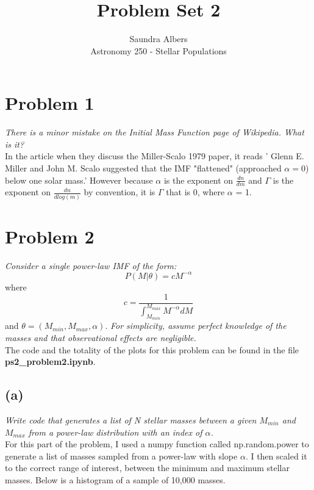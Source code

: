 \documentclass[english,11pt]{article}
\begin{document}
 

 
\title{Problem Set 2}
\author{Saundra Albers\\ 
Astronomy 250 - Stellar Populations} 
 
\maketitle
 

\section*{Problem 1}
\textit{There is a minor mistake on the Initial Mass Function page of Wikipedia. What is it?}\\
In the article when they discuss the Miller-Scalo 1979 paper, it reads ' Glenn E. Miller and John M. Scalo suggested that the IMF "flattened" (approached $\alpha = 0$) below one solar mass.'
However because $\alpha$ is the exponent on $\frac{dn}{dm}$ and $\Gamma$ is the exponent on $\frac{dn}{d log(m)}$ by convention, it is $\Gamma$ that is 0, where $\alpha$ = 1.

\section*{Problem 2}
\textit{Consider a single power-law IMF of the form:}
\begin{equation}
P(M|\theta) = c M^{-\alpha}
\end{equation}
where
\begin{equation}
c = \frac{1}{\int_{M_{min}}^{M_{max}}M^{-\alpha}dM}
\end{equation}
and $\theta = (M_{min}, M_{max}, \alpha)$.
\textit{For simplicity, assume perfect knowledge of the masses and that observational effects are negligible.}\\
The code and the totality of the plots for this problem can be found in the file \textbf{ps2\_problem2.ipynb}.
\subsection*{(a)}
\textit{Write code that generates a list of N stellar masses between a given $M_{min}$ and $M_{max}$ from a power-law distribution with an index of $\alpha$.}\\
For this part of the problem, I used  a numpy function called np.random.power to generate a list of masses sampled from a power-law with slope $\alpha$. I then scaled it to the correct range of interest, between the minimum and maximum stellar masses. Below is a histogram of a sample of 10,000 masses.
\end{document}
